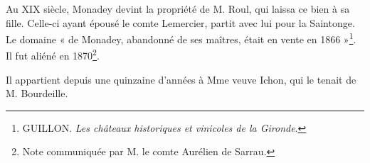 Au XIX\ieme{} siècle, Monadey devint la propriété de M. Roul, qui laissa ce bien à sa fille. Celle-ci ayant épousé le comte Lemercier, partit avec lui pour la Saintonge. Le domaine « de Monadey, abandonné de ses maîtres, était en vente en 1866 »\footnote{GUILLON. \textit{Les châteaux historiques et vinicoles de la Gironde}.}. Il fut aliéné en 1870\footnote{Note communiquée par M. le comte Aurélien de Sarrau.}.

Il appartient depuis une quinzaine d'années à Mme veuve Ichon, qui le tenait de M. Bourdeille. 

